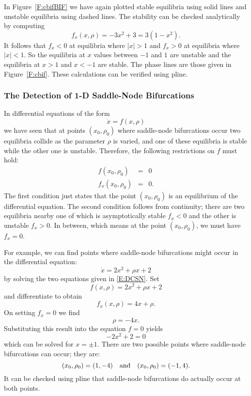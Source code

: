 \documentclass{ximera}
\begin{document}
In Figure~\ref{F:cbifBIF} we have again plotted stable equilibria
 using solid lines and unstable equilibria
 using dashed lines.  The
stability can be checked analytically by computing
\[
f_x(x,\rho) = -3x^2+3 = 3(1-x^2).
\]
It follows that $f_x<0$ at equilibria where $|x|>1$ and $f_x>0$ at 
equilibria where $|x|<1$.  So the equilibria at $x$ values between 
$-1$ and $1$ are unstable and the equilibria at $x>1$ and $x<-1$ are 
stable.  The phase lines are those given in Figure~\ref{F:cbif}.  These 
calculations can be verified using {\sf pline}. 

\vspace{0.4in}

\begin{figure*}[htb]
           \centerline{%
           }
           \caption{Phase lines for the differential equation
        \protect\eqref{E:cbif}.}
           \label{F:cbif}
\end{figure*}

\subsubsection*{The Detection of 1-D Saddle-Node Bifurcations}

In differential equations of the form
\[
\dot{x} = f(x,\rho)
\]
we have seen that at points $(x_0,\rho_0)$ where saddle-node bifurcations
occur two equilibria collide as the parameter $\rho$ is varied, and one of 
these equilibria is stable while the other one is unstable.  Therefore, the
following restrictions on $f$ must hold:
\begin{equation}  \label{E:DCSN}
\begin{array}{rcl}
f(x_0,\rho_0) & = & 0\\
f_x(x_0,\rho_0) & = & 0.
\end{array}
\end{equation}
The first condition just states that the point $(x_0,\rho_0)$ is an
equilibrium of the differential equation.  The second condition follows from
continuity; there are two equilibria nearby one of which is asymptotically 
stable $f_x<0$ and the other is unstable $f_x>0$.  In between, which means at
the point $(x_0,\rho_0)$, we must have $f_x=0$.

For example, we can find points where saddle-node bifurcations might occur in 
the differential equation:
\[
\dot{x} = 2x^2 +\rho x + 2
\]
by solving the two equations given in \eqref{E:DCSN}.  Set 
\[
f(x,\rho) = 2x^2 +\rho x + 2
\]
and differentiate to obtain
\[
f_x(x,\rho) = 4x + \rho.
\]
On setting $f_x=0$ we find
\[
\rho = -4x.
\]
Substituting this result into the equation $f=0$ yields
\[
-2x^2 + 2 =0
\]
which can be solved for $x=\pm 1$.  There are two possible points where
saddle-node bifurcations can occur; they are:
\[
(x_0,\rho_0) = (1,-4) \quad\mbox{and}\quad  (x_0,\rho_0) = (-1,4).
\]
It can be checked using {\sf pline} that saddle-node bifurcations do actually
occur at both points.
\end{document}
